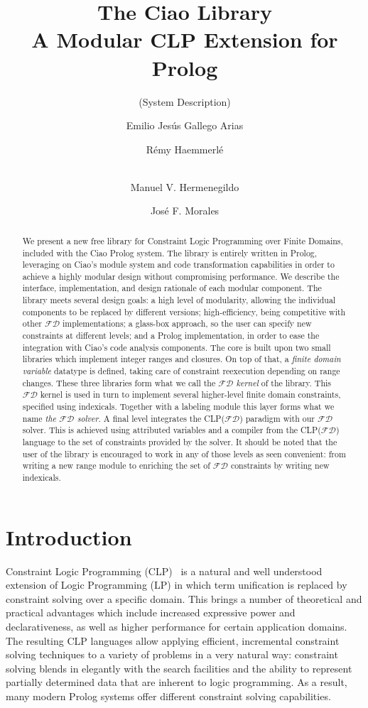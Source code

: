 \documentclass{llncs}
\title{The Ciao \clpfd Library \\ A Modular CLP Extension for Prolog}
\subtitle{(System Description)}
\author{Emilio Jesús Gallego Arias\inst{1} \and Rémy Haemmerlé\inst{1} \and \\ Manuel V. Hermenegildo\inst{1,2} \and José F. Morales\inst{2}}
\institute{Universidad Politécnica de Madrid \and IMDEA Software Institute }
\newcommand{\clpfd}{CLP($\mathcal{FD}$)\xspace}
\newcommand{\fd}{$\mathcal{FD}$\xspace}
\begin{document}
\maketitle

\begin{abstract}
  We present a new free library for Constraint Logic Programming over
  Finite Domains, included with the Ciao Prolog system.
The library is entirely written in Prolog, leveraging on Ciao's
  module system and code transformation capabilities in order to
  achieve a highly modular design without compromising performance.
  We describe the interface, implementation, and design rationale of
  each modular component.
The library meets several design goals: a high level of modularity,
  allowing the individual components to be replaced by different
  versions; high-efficiency, being competitive with other \fd
  implementations; a glass-box approach, so the user can specify new
  constraints at different levels; and a Prolog implementation, in order
  to ease the integration with Ciao's code analysis components.
The core is built upon two small libraries which implement integer
  ranges and closures. On top of that, a \emph{finite domain variable}
  datatype is defined, taking care of constraint reexecution depending
  on range changes. These three libraries form what we call the
  \emph{\fd kernel} of the library.
This \fd kernel is used in turn to implement several higher-level
  finite domain constraints, specified using indexicals. Together with
  a labeling module this layer forms what we name \emph{the \fd
    solver}.
A final level integrates the \clpfd paradigm with
  our \fd solver. This is achieved using attributed variables and a
  compiler from the \clpfd language to the set of constraints
  provided by the solver.
It should be noted that the user of the library is encouraged to
  work in any of those levels as seen convenient: from writing a
  new range module to enriching the set of \fd constraints by writing
  new indexicals.
\end{abstract}

\section{Introduction}
\label{sec:introduction}

Constraint Logic Programming (CLP)~\cite{survey94-short} is a natural
and well understood extension of Logic
Programming (LP) in which term unification is replaced by constraint
solving over a specific domain.  This brings a number of theoretical
and practical advantages which include increased expressive power and
declarativeness, as well as higher performance for certain application
domains.  The resulting CLP languages allow applying efficient,
incremental constraint solving techniques to a variety of problems in
a very natural way: constraint solving blends in elegantly with the
search facilities and the ability to represent partially determined
data that are inherent to logic programming.  As a result, many modern
Prolog systems offer different constraint solving capabilities.
\end{document}
